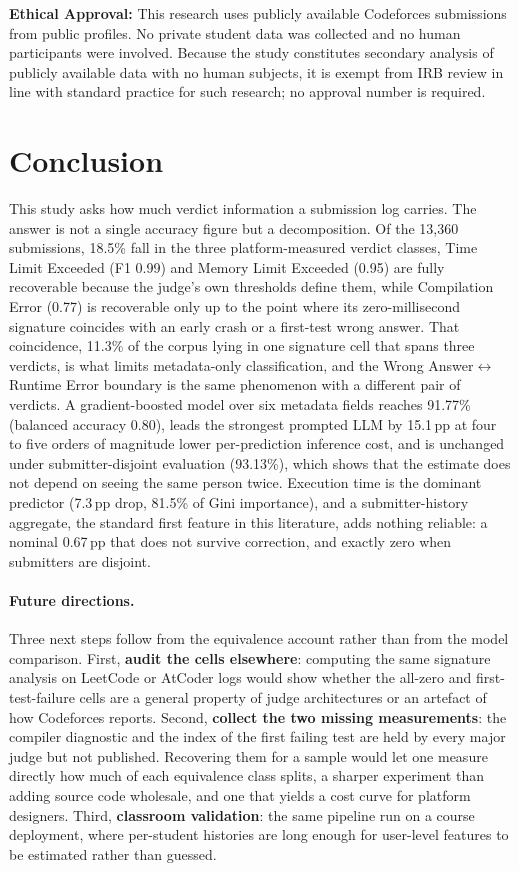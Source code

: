 \documentclass[acmsmall]{acmart}
\begin{document}
\textbf{Ethical Approval:} This research uses publicly available Codeforces
submissions from public profiles. No private student data was collected and no
human participants were involved. Because the study constitutes secondary
analysis of publicly available data with no human subjects, it is exempt from
IRB review in line with standard practice for such research; no approval
number is required.

\section{Conclusion}

This study asks how much verdict information a submission log carries. The
answer is not a single accuracy figure but a decomposition. Of the 13,360
submissions, 18.5\% fall in the three platform-measured verdict classes, Time
Limit Exceeded (F1 0.99) and Memory Limit Exceeded (0.95) are fully
recoverable because the judge's own thresholds define them, while Compilation
Error (0.77) is recoverable only up to the point where its zero-millisecond
signature coincides with an early crash or a first-test wrong answer. That
coincidence, 11.3\% of the corpus lying in one signature cell that spans three
verdicts, is what limits metadata-only classification, and the
Wrong Answer$\leftrightarrow$Runtime Error boundary is the same phenomenon with
a different pair of verdicts. A gradient-boosted model over six metadata fields
reaches 91.77\% (balanced accuracy 0.80), leads the strongest prompted LLM by
15.1\,pp at four to five orders of magnitude lower per-prediction inference
cost, and is unchanged under
submitter-disjoint evaluation (93.13\%), which shows that the estimate does not
depend on seeing the same person twice. Execution time is the dominant
predictor (7.3\,pp drop, 81.5\% of Gini importance), and a submitter-history
aggregate, the standard first feature in this literature, adds nothing
reliable: a nominal 0.67\,pp that does not survive correction, and exactly zero
when submitters are disjoint.

\paragraph{Future directions.}\label{sec:future} Three next steps follow from the
equivalence account rather than from the model comparison. First,
\textbf{audit the cells elsewhere}: computing the same signature analysis on
LeetCode or AtCoder logs would show whether the all-zero and first-test-failure
cells are a general property of judge architectures or an artefact of how
Codeforces reports. Second, \textbf{collect the two missing measurements}: the
compiler diagnostic and the index of the first failing test are held by every
major judge but not published. Recovering them for a sample would let one
measure directly how much of each equivalence class splits, a sharper
experiment than adding source code wholesale, and one that yields a cost curve
for platform designers. Third, \textbf{classroom validation}: the same pipeline
run on a course deployment, where per-student histories are long enough for
user-level features to be estimated rather than guessed.
\end{document}
